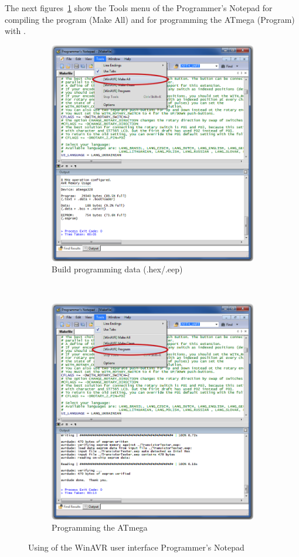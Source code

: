 The next figures~\ref{fig:WinAVR2} show the Tools menu of the Programmer's Notepad
for compiling the program (Make All) and for programming the ATmega (Program) with .

\begin{figure}[H]
  \begin{subfigure}[b]{.5\textwidth}
    \centering
    \includegraphics[width=.85\textwidth]{../PNG/Notepad_make.png}
    \caption{Build programming data (.hex/.eep)}
  \end{subfigure}
  ~
  \begin{subfigure}[b]{.5\textwidth}
    \centering
    \includegraphics[width=.85\textwidth]{../PNG/Notepad_program.png}
    \caption{Programming the ATmega}
  \end{subfigure}
  \caption{Using of the WinAVR user interface Programmer's Notepad}
  \label{fig:WinAVR2}
\end{figure}



